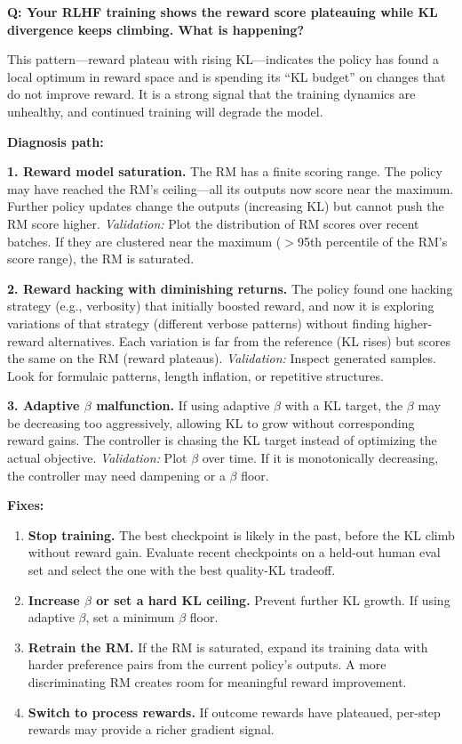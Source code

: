 \begin{interviewq}
\textbf{Q: Your RLHF training shows the reward score plateauing while KL divergence keeps climbing. What is happening?}

 \quad {} \quad \badgefreq{\freqlow}

\stronganswer

This pattern---reward plateau with rising KL---indicates the policy has found a local optimum in reward space and is spending its ``KL budget'' on changes that do not improve reward. It is a strong signal that the training dynamics are unhealthy, and continued training will degrade the model.

\textbf{Diagnosis path:}

\textbf{1. Reward model saturation.} The RM has a finite scoring range. The policy may have reached the RM's ceiling---all its outputs now score near the maximum. Further policy updates change the outputs (increasing KL) but cannot push the RM score higher. \textit{Validation:} Plot the distribution of RM scores over recent batches. If they are clustered near the maximum ($>$95th percentile of the RM's score range), the RM is saturated.

\textbf{2. Reward hacking with diminishing returns.} The policy found one hacking strategy (e.g., verbosity) that initially boosted reward, and now it is exploring variations of that strategy (different verbose patterns) without finding higher-reward alternatives. Each variation is far from the reference (KL rises) but scores the same on the RM (reward plateaus). \textit{Validation:} Inspect generated samples. Look for formulaic patterns, length inflation, or repetitive structures.

\textbf{3. Adaptive $\beta$ malfunction.} If using adaptive $\beta$ with a KL target, the $\beta$ may be decreasing too aggressively, allowing KL to grow without corresponding reward gains. The controller is chasing the KL target instead of optimizing the actual objective. \textit{Validation:} Plot $\beta$ over time. If it is monotonically decreasing, the controller may need dampening or a $\beta$ floor.

\textbf{Fixes:}
\begin{enumerate}
    \item \textbf{Stop training.} The best checkpoint is likely in the past, before the KL climb without reward gain. Evaluate recent checkpoints on a held-out human eval set and select the one with the best quality-KL tradeoff.
    \item \textbf{Increase $\beta$ or set a hard KL ceiling.} Prevent further KL growth. If using adaptive $\beta$, set a minimum $\beta$ floor.
    \item \textbf{Retrain the RM.} If the RM is saturated, expand its training data with harder preference pairs from the current policy's outputs. A more discriminating RM creates room for meaningful reward improvement.
    \item \textbf{Switch to process rewards.} If outcome rewards have plateaued, per-step rewards may provide a richer gradient signal.
\end{enumerate}


\end{interviewq}
